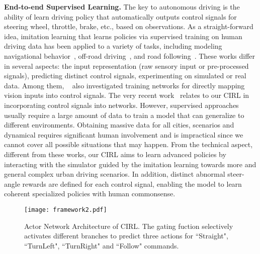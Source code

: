 \documentclass[runningheads]{llncs}
\begin{document}
\textbf{End-to-end Supervised Learning.} The key to autonomous driving is the ability of learn driving policy that automatically outputs control signals for steering wheel, throttle, brake, etc., based on observations. As a straight-forward idea, imitation learning that learns policies via supervised training on human driving data has been applied to a variety of tasks,
including modeling navigational behavior~\cite{ziebart2008navigate}, off-road driving~\cite{muller2006off,silver2010learning}, and road following~\cite{xu2017end,bojarski2016end,pomerleau1989alvinn,zhang2017query,codevilla2017end}. These works differ in several aspects: the input representation (raw sensory input or pre-processed signals), predicting distinct control signals, experimenting on simulated or real data. Among them, ~\cite{pomerleau1989alvinn,muller2006off,codevilla2017end,bojarski2016end} also investigated training networks for directly mapping vision inputs into control signals. The very recent work~\cite{codevilla2017end} relates to our CIRL in incorporating control signals into networks. However, supervised approaches usually require a
large amount of data to train a model that can generalize to different environments. Obtaining massive data for all cities, scenarios and dynamical requires significant human involvement and is impractical since we cannot cover all possible situations that may happen. From the technical aspect, different from these works, our CIRL aims to learn advanced policies by interacting with the simulator guided by the imitation learning towards more and general complex urban driving scenarios. In addition, distinct abnormal steer-angle rewards are defined for each control signal, enabling the
model to learn coherent specialized policies with human commonsense.

\begin{figure*}[!tp]
        \begin{center}
    \texttt{[image: framework2.pdf]}\vspace{-3mm}
            \caption{Actor Network Architecture of CIRL. The gating fuction selectively activates different branches to predict three actions for ``Straight", ``TurnLeft", ``TurnRight" and ``Follow" commands. }\vspace{-7mm} 
            \label{fig:actor}
        \end{center}
    \end{figure*}
\end{document}
